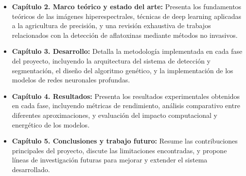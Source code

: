 \begin{itemize}
    \item \textbf{Capítulo 2. Marco teórico y estado del arte:} Presenta los fundamentos teóricos de las imágenes hiperespectrales, técnicas de deep learning aplicadas a la agricultura de precisión, y una revisión exhaustiva de trabajos relacionados con la detección de aflatoxinas mediante métodos no invasivos.
    \item \textbf{Capítulo 3. Desarrollo:} Detalla la metodología implementada en cada fase del proyecto, incluyendo la arquitectura del sistema de detección y segmentación, el diseño del algoritmo genético, y la implementación de los modelos de redes neuronales profundas.
    \item \textbf{Capítulo 4. Resultados:} Presenta los resultados experimentales obtenidos en cada fase, incluyendo métricas de rendimiento, análisis comparativo entre diferentes aproximaciones, y evaluación del impacto computacional y energético de los modelos.
    \item \textbf{Capítulo 5. Conclusiones y trabajo futuro:} Resume las contribuciones principales del proyecto, discute las limitaciones encontradas, y propone líneas de investigación futuras para mejorar y extender el sistema desarrollado.
\end{itemize}
